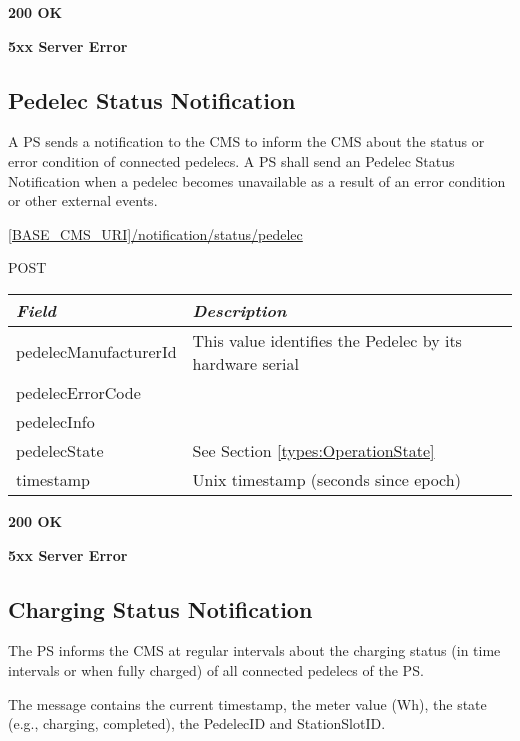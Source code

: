  \textbf{200 OK}

 \textbf{5xx Server Error}

\subsection{Pedelec Status Notification}

A \acs{PS} sends a notification to the \acs{CMS} to inform the \acs{CMS} about the status or error condition of connected pedelecs. A \acs{PS} shall send an Pedelec Status Notification when a pedelec becomes unavailable as a result of an error condition or other external events.

 \url{[BASE_CMS_URI]/notification/status/pedelec}

 POST

\begin{table}[!h]
\vspace{-7mm}
\begin{tabularx}{\linewidth}{ | l | X | }
  \hline
  \textit{Field} & \textit{Description} \\
  \hline \hline
  pedelecManufacturerId 		& This value identifies the Pedelec by its hardware serial\\
  pedelecErrorCode & \\
  pedelecInfo & \\
  pedelecState & See Section \ref{types:OperationState} \\
  timestamp & Unix timestamp (seconds since epoch) \\
  \hline
\end{tabularx}
\end{table}

 \textbf{200 OK}

 \textbf{5xx Server Error}


\subsection{Charging Status Notification}
\label{ps:charging-status}

The \acs{PS} informs the \acs{CMS} at regular intervals about the charging status (in time intervals or when fully charged) of all connected pedelecs of the \acs{PS}.

The message contains the current timestamp, the meter value (Wh), the state (e.g., charging, completed), the PedelecID and StationSlotID.

